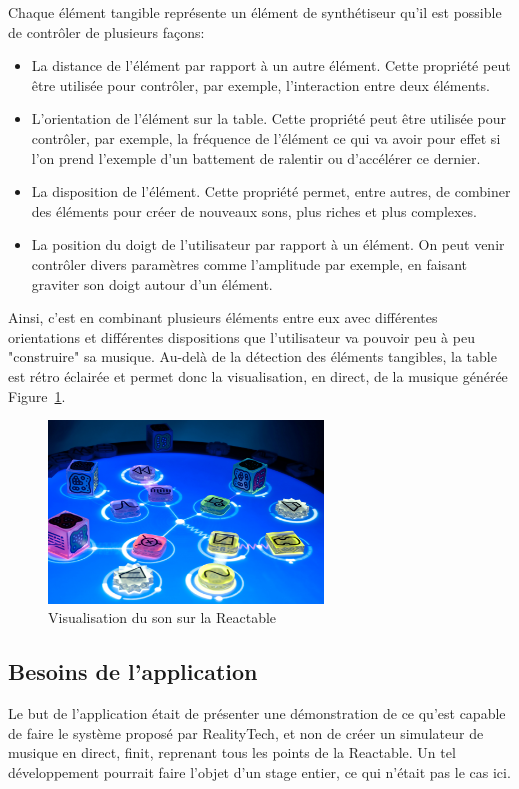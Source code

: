 Chaque élément tangible représente un élément de synthétiseur qu'il est possible de contrôler de plusieurs façons:
\begin{itemize} 
\item La distance de l'élément par rapport à un autre élément. Cette propriété peut être utilisée pour contrôler, par exemple, l'interaction entre deux éléments.
\item L'orientation de l'élément sur la table. Cette propriété peut être utilisée pour contrôler, par exemple, la fréquence de l'élément ce qui va avoir pour effet si l'on prend l'exemple d'un battement de ralentir ou d'accélérer ce dernier.
\item La disposition de l'élément. Cette propriété permet, entre autres, de combiner des éléments pour créer de nouveaux sons, plus riches et plus complexes.
\item La position du doigt de l'utilisateur par rapport à un élément. On peut venir contrôler divers paramètres comme l'amplitude par exemple, en faisant graviter son doigt autour d'un élément.
\end{itemize}
Ainsi, c'est en combinant plusieurs éléments entre eux avec différentes orientations et différentes dispositions que l'utilisateur va pouvoir peu à peu "construire" sa musique.
Au-delà de la détection des éléments tangibles, la table est rétro éclairée et permet donc la visualisation, en direct, de la musique générée Figure~\ref{fig:reactivsu}.

\begin{figure}[H]
\centering
\includegraphics[width=0.65\textwidth]{images/reactvisu}
\caption{Visualisation du son sur la Reactable\protect\footnotemark}
\label{fig:reactivsu}
\end{figure}


\subsection{Besoins de l'application}
\label{subsec:reartable:content}
Le but de l'application était de présenter une démonstration de ce qu'est capable de faire le système proposé par RealityTech, et non de créer un simulateur de musique en direct, finit, reprenant tous les points de la Reactable. Un tel développement pourrait faire l'objet d'un stage entier, ce qui n'était pas le cas ici.\\

